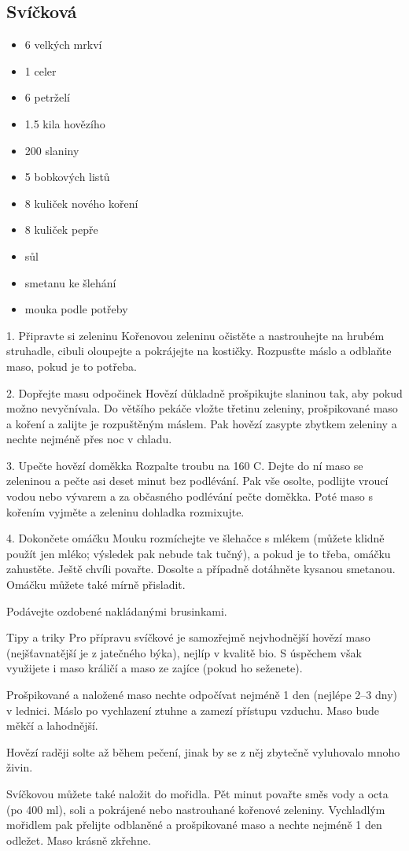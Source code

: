 \documentclass[10pt,a4paper]{article}
\newenvironment{myitemize}
{ \begin{itemize}
    \setlength{\itemsep}{0pt}
    \setlength{\parskip}{0pt}
    \setlength{\parsep}{0pt}     }
{ \end{itemize}                  }
\begin{document}
\subsection{Svíčková}
\begin{minipage}[t]{0,5\textwidth}
\begin{myitemize} 
\item 6 velkých mrkví
\item 1 celer
\item 6 petrželí
\item 1.5 kila hovězího
\item 200 slaniny
\item 5 bobkových listů
\item 8 kuliček nového koření
\item 8 kuliček pepře
\item sůl
\item smetanu ke šlehání
\item mouka podle potřeby 
\end{myitemize}
\end{minipage}
\begin{minipage}[t]{0,5\textwidth}
1. Připravte si zeleninu
Kořenovou zeleninu očistěte a nastrouhejte na hrubém struhadle, cibuli oloupejte a pokrájejte na kostičky. Rozpusťte máslo a odblaňte maso, pokud je to potřeba.

2. Dopřejte masu odpočinek
Hovězí důkladně prošpikujte slaninou tak, aby pokud možno nevyčnívala. Do většího pekáče vložte třetinu zeleniny, prošpikované maso a koření a zalijte je rozpuštěným máslem. Pak hovězí zasypte zbytkem zeleniny a nechte nejméně přes noc v chladu.

3. Upečte hovězí doměkka
Rozpalte troubu na 160 \degree C. Dejte do ní maso se zeleninou a pečte asi deset minut bez podlévání. Pak vše osolte, podlijte vroucí vodou
nebo vývarem a za občasného podlévání pečte doměkka. Poté maso s kořením vyjměte a zeleninu dohladka rozmixujte.

4. Dokončete omáčku
Mouku rozmíchejte ve šlehačce s mlékem (můžete klidně použít jen mléko; výsledek pak nebude tak tučný), a pokud je to třeba, omáčku zahustěte. Ještě chvíli povařte. Dosolte a případně dotáhněte kysanou smetanou. Omáčku můžete také mírně přisladit.

Podávejte ozdobené nakládanými brusinkami.

Tipy a triky
Pro přípravu svíčkové je samozřejmě nejvhodnější hovězí maso (nejšťavnatější je z jatečného býka), nejlíp v kvalitě bio. S úspěchem
však využijete i maso králičí a maso ze zajíce (pokud ho seženete).

Prošpikované a naložené maso nechte odpočívat nejméně 1 den (nejlépe 2–3 dny) v lednici. Máslo po vychlazení ztuhne a zamezí
přístupu vzduchu. Maso bude měkčí a lahodnější.

Hovězí raději solte až během pečení, jinak by se z něj zbytečně vyluhovalo mnoho živin.

Svíčkovou můžete také naložit do mořidla. Pět minut povařte směs vody a octa (po 400 ml), soli a pokrájené nebo nastrouhané kořenové zeleniny. Vychladlým mořidlem pak přelijte odblaněné a prošpikované maso a nechte nejméně 1 den odležet. Maso krásně zkřehne.
\end{minipage}
\end{document}
